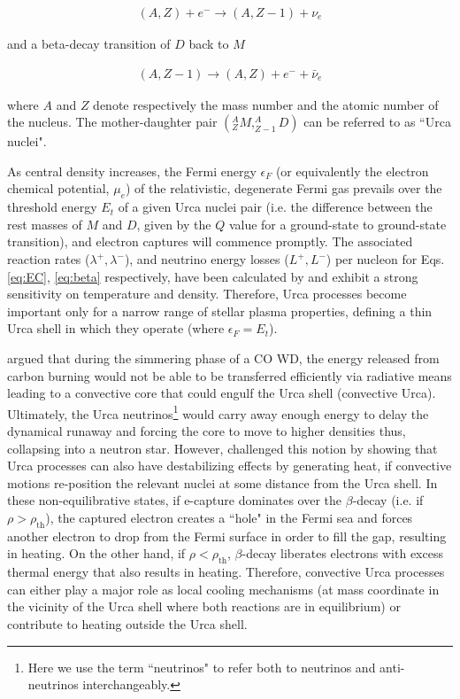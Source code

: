 \documentclass[../../main/thesis_msc.tex]{subfiles}
\begin{document}
\begin{align}
    \label{eq:EC}
    (A,Z) + e^{-} \longrightarrow (A,Z-1) + \nu_{e}
\end{align}

\noindent and a beta-decay transition of $D$ back to $M$

\begin{align}
    \label{eq:beta}
    (A,Z-1) \longrightarrow (A,Z) + e^{-} + \bar{\nu}_e
\end{align}

\noindent where $A$ and $Z$ denote respectively the mass number and the atomic number of the nucleus. The mother-daughter pair $(^A _Z{M}, ^A _{Z-1}{D})$ can be referred to as ``Urca nuclei". 

As central density increases, the Fermi energy $\epsilon_F$ (or equivalently the electron chemical potential, $\mu_e$) of the relativistic, degenerate Fermi gas prevails over the threshold energy $E_t$ of a given Urca nuclei pair (i.e. the difference between the rest masses of $M$ and $D$, given by the $Q$ value for a ground-state to ground-state transition), and electron captures will commence promptly. The associated reaction rates ($\lambda^{+}, \lambda^{-}$), and neutrino energy losses ($L^{+}, L^{-}$) per nucleon for Eqs.\,\ref{eq:EC}, \ref{eq:beta} respectively, have been calculated by \cite{Tsuruta1970} and exhibit a strong sensitivity on temperature and density. Therefore, Urca processes become important only for a narrow range of stellar plasma properties, defining a thin Urca shell in which they operate (where $\epsilon_F = E_t$).

\cite{Paczy1972} argued that during the simmering phase of a CO WD, the energy released from carbon burning would not be able to be transferred efficiently via radiative means leading to a convective core that could engulf the Urca shell (convective Urca). Ultimately, the Urca neutrinos\footnote{Here we use the term ``neutrinos" to refer both to neutrinos and anti-neutrinos interchangeably.} would carry away enough energy to delay the dynamical runaway and forcing the core to move to higher densities thus, collapsing into a neutron star. However, \cite{Bruenn1973} challenged this notion by showing that Urca processes can also have destabilizing effects by generating heat, if convective motions re-position the relevant nuclei at some distance from the Urca shell. In these non-equilibrative states, if e-capture dominates over the $\beta$-decay (i.e. if $\rho > \rho_{\text{th}}$), the captured electron creates a ``hole" in the Fermi sea and forces another electron to drop from the Fermi surface in order to fill the gap, resulting in heating. On the other hand, if $\rho < \rho_{\text{th}}$, $\beta$-decay liberates electrons with excess thermal energy that also results in heating. Therefore, convective Urca processes can either play a major role as local cooling mechanisms (at mass coordinate in the vicinity of the Urca shell where both reactions are in equilibrium) or contribute to heating outside the Urca shell.
\end{document}
